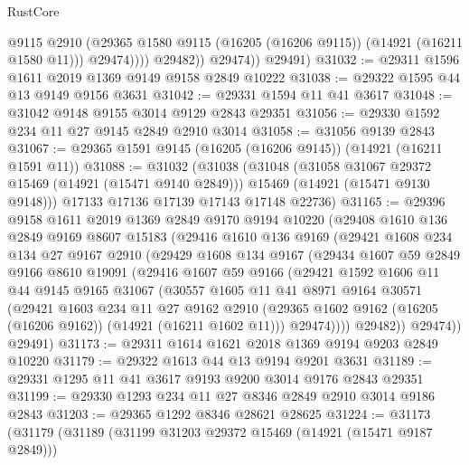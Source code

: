 \begin{lexlean}{RustCore}
\begin{coremodule}
                      @9115
                      @2910
                      (@29365 @1580 @9115 (@16205 (@16206 @9115)) (@14921 (@16211 @1580 @11)))
                      @29474))))
              @29482))
          @29474))
      @29491)
@31032 := @29311 @1596 @1611 @2019 @1369 @9149 @9158 @2849 @10222
@31038 := @29322 @1595 @44 @13 @9149 @9156 @3631
@31042 := @29331 @1594 @11 @41 @3617
@31048 := @31042 @9148 @9155 @3014 @9129 @2843 @29351
@31056 := @29330 @1592 @234 @11 @27 @9145 @2849 @2910 @3014
@31058 := @31056 @9139 @2843
@31067 := @29365 @1591 @9145 (@16205 (@16206 @9145)) (@14921 (@16211 @1591 @11))
@31088 := @31032
    (@31038
      (@31048
        (@31058 @31067 @29372 @15469 (@14921 (@15471 @9140 @2849)))
        @15469
        (@14921 (@15471 @9130 @9148)))
      @17133
      @17136
      @17139
      @17143
      @17148
      @22736)
@31165 := @29396
    @9158
    @1611
    @2019
    @1369
    @2849
    @9170
    @9194
    @10220
    (@29408
      @1610
      @136
      @2849
      @9169
      @8607
      @15183
      (@29416
        @1610
        @136
        @9169
        (@29421
          @1608
          @234
          @134
          @27
          @9167
          @2910
          (@29429
            @1608
            @134
            @9167
            (@29434
              @1607
              @59
              @2849
              @9166
              @8610
              @19091
              (@29416
                @1607
                @59
                @9166
                (@29421
                  @1592
                  @1606
                  @11
                  @44
                  @9145
                  @9165
                  @31067
                  (@30557
                    @1605
                    @11
                    @41
                    @8971
                    @9164
                    @30571
                    (@29421
                      @1603
                      @234
                      @11
                      @27
                      @9162
                      @2910
                      (@29365 @1602 @9162 (@16205 (@16206 @9162)) (@14921 (@16211 @1602 @11)))
                      @29474))))
              @29482))
          @29474))
      @29491)
@31173 := @29311 @1614 @1621 @2018 @1369 @9194 @9203 @2849 @10220
@31179 := @29322 @1613 @44 @13 @9194 @9201 @3631
@31189 := @29331 @1295 @11 @41 @3617 @9193 @9200 @3014 @9176 @2843 @29351
@31199 := @29330 @1293 @234 @11 @27 @8346 @2849 @2910 @3014 @9186 @2843
@31203 := @29365 @1292 @8346 @28621 @28625
@31224 := @31173
    (@31179
      (@31189
        (@31199 @31203 @29372 @15469 (@14921 (@15471 @9187 @2849)))

\end{coremodule}
\end{lexlean}
